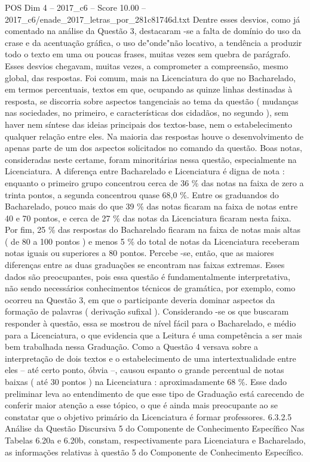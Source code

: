 \begin{textsample}{POS Dim 4 – 2017\_c6 – Score 10.00 – 2017\_c6/enade\_2017\_letras\_por\_281c81746d.txt}
Dentre esses desvios, como já comentado na análise da Questão 3, destacaram -se a falta de domínio do uso da crase e da acentuação gráfica, o uso de"onde"não locativo, a tendência a produzir todo o texto em uma ou poucas frases, muitas vezes sem quebra de parágrafo.
Esses desvios chegavam, muitas vezes, a comprometer a compreensão, mesmo global, das respostas.
Foi comum, mais na Licenciatura do que no Bacharelado, em termos percentuais, textos em que, ocupando as quinze linhas destinadas à resposta, se discorria sobre aspectos tangenciais ao tema da questão ( mudanças nas sociedades, no primeiro, e características dos cidadãos, no segundo ), sem haver nem síntese das ideias principais dos textos-base, nem o estabelecimento qualquer relação entre eles.
Na maioria das respostas houve o desenvolvimento de apenas parte de um dos aspectos solicitados no comando da questão.
Boas notas, consideradas neste certame, foram minoritárias nessa questão, especialmente na Licenciatura.
A diferença entre Bacharelado e Licenciatura é digna de nota : enquanto o primeiro grupo concentrou cerca de 36 \% das notas na faixa de zero a trinta pontos, a segunda concentrou quase 68,0 \%.
Entre os graduandos do Bacharelado, pouco mais do que 39 \% das notas ficaram na faixa de notas entre 40 e 70 pontos, e cerca de 27 \% das notas da Licenciatura ficaram nesta faixa.
Por fim, 25 \% das respostas do Bacharelado ficaram na faixa de notas mais altas ( de 80 a 100 pontos ) e menos 5 \% do total de notas da Licenciatura receberam notas iguais ou superiores a 80 pontos.
Percebe -se, então, que as maiores diferenças entre as duas graduações se encontram nas faixas extremas.
Esses dados são preocupantes, pois essa questão é fundamentalmente interpretativa, não sendo necessários conhecimentos técnicos de gramática, por exemplo, como ocorreu na Questão 3, em que o participante deveria dominar aspectos da formação de palavras ( derivação sufixal ).
Considerando -se os que buscaram responder à questão, essa se mostrou de nível fácil para o Bacharelado, e médio para a Licenciatura, o que evidencia que a Leitura é uma competência a ser mais bem trabalhada nessa Graduação.
Como a Questão 4 versava sobre a interpretação de dois textos e o estabelecimento de uma intertextualidade entre eles – até certo ponto, óbvia –, causou espanto o grande percentual de notas baixas ( até 30 pontos ) na Licenciatura : aproximadamente 68 \%.
Esse dado preliminar leva ao entendimento de que esse tipo de Graduação está carecendo de conferir maior atenção a esse tópico, o que é ainda mais preocupante ao se constatar que o objetivo primário da Licenciatura é formar professores. 6.3.2.5 Análise da Questão Discursiva 5 do Componente de Conhecimento Específico Nas Tabelas 6.20a e 6.20b, constam, respectivamente para Licenciatura e Bacharelado, as informações relativas à questão 5 do Componente de Conhecimento Específico.

\end{textsample}
